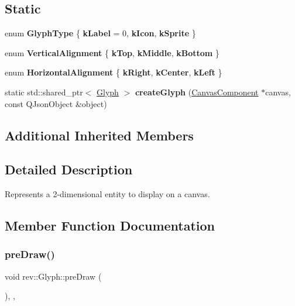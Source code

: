 \subsection*{Static}
\begin{DoxyCompactItemize}
\item 
\mbox{\label{classrev_1_1_glyph_a4b6c692fd99128d242ecb93e66129e8e}} 
enum {\bfseries Glyph\+Type} \{ {\bfseries k\+Label} = 0, 
{\bfseries k\+Icon}, 
{\bfseries k\+Sprite}
 \}
\item 
\mbox{\label{classrev_1_1_glyph_a5c5e0b5ee824f5bc88757f5732b9fc85}} 
enum {\bfseries Vertical\+Alignment} \{ {\bfseries k\+Top}, 
{\bfseries k\+Middle}, 
{\bfseries k\+Bottom}
 \}
\item 
\mbox{\label{classrev_1_1_glyph_a8d9b34f1811e6eeacb7f1efc03ee6c2d}} 
enum {\bfseries Horizontal\+Alignment} \{ {\bfseries k\+Right}, 
{\bfseries k\+Center}, 
{\bfseries k\+Left}
 \}
\item 
\mbox{\label{classrev_1_1_glyph_ac7b30fe806786cc0ad7b7725dcdcc86e}} 
static std\+::shared\+\_\+ptr$<$ \mbox{\hyperlink{classrev_1_1_glyph}{Glyph}} $>$ {\bfseries create\+Glyph} (\mbox{\hyperlink{classrev_1_1_canvas_component}{Canvas\+Component}} $\ast$canvas, const Q\+Json\+Object \&object)
\end{DoxyCompactItemize}
\subsection*{Additional Inherited Members}


\subsection{Detailed Description}
Represents a 2-\/dimensional entity to display on a canvas. 

\subsection{Member Function Documentation}
\mbox{\label{classrev_1_1_glyph_a8abb4e9ab9d6a23c87450284b86dc636}} 
\subsubsection{\texorpdfstring{preDraw()}{preDraw()}}
{\footnotesize\ttfamily void rev\+::\+Glyph\+::pre\+Draw (\begin{DoxyParamCaption}{ }\end{DoxyParamCaption})\hspace{0.3cm}{\ttfamily [override]}, {\ttfamily [protected]}, {\ttfamily [virtual]}}



